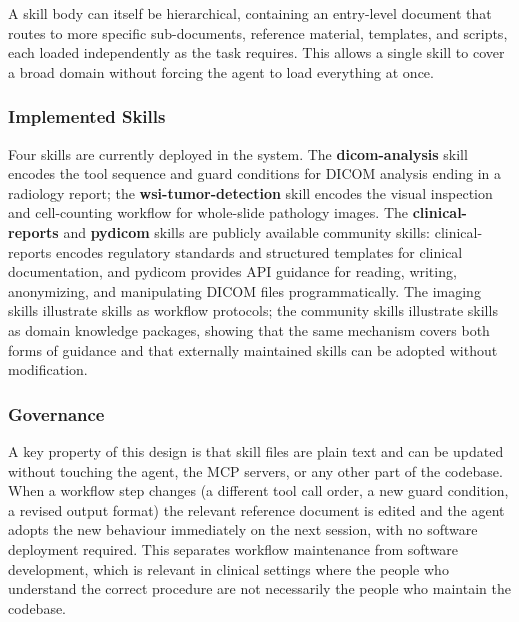 \documentclass[conference]{IEEEtran}
\begin{document}
A skill body can itself be hierarchical, containing an entry-level
document that routes to more specific sub-documents, reference
material, templates, and scripts, each loaded independently as the
task requires. This allows a single skill to cover a broad domain
without forcing the agent to load everything at once.

\subsubsection{Implemented Skills}

Four skills are currently deployed in the system. The
\textbf{dicom-analysis} skill encodes the tool sequence and guard
conditions for DICOM analysis ending in a radiology report; the
\textbf{wsi-tumor-detection} skill encodes the visual inspection and
cell-counting workflow for whole-slide pathology images. The
\textbf{clinical-reports} and \textbf{pydicom} skills are publicly
available community skills: clinical-reports encodes
regulatory standards and structured templates for clinical
documentation, and pydicom provides API guidance for reading, writing,
anonymizing, and manipulating DICOM files programmatically. The imaging
skills illustrate skills as workflow protocols; the community skills
illustrate skills as domain knowledge packages, showing that the same
mechanism covers both forms of guidance and that externally maintained
skills can be adopted without modification.


\subsubsection{Governance}

A key property of this design is that skill files are plain text and
can be updated without touching the agent, the MCP servers, or any
other part of the codebase. When a workflow step changes (a
different tool call order, a new guard condition, a revised output
format) the relevant reference document is edited and the agent
adopts the new behaviour immediately on the next session, with no
software deployment required. This separates workflow maintenance from
software development, which is relevant in clinical settings where the
people who understand the correct procedure are not necessarily the
people who maintain the codebase.


\end{document}

